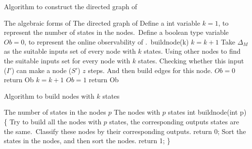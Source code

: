 \begin{algorithm}[h]
\caption{Algorithm to construct the directed graph of \BCNs}
\begin{algorithmic}[1]
\REQUIRE 
The algebraic forms of \BCN
\ENSURE  
The directed graph of \BCN
\STATE Define a int variable $k=1$, to represent the number of states in the nodes.\
\STATE Define a boolean type variable $Ob=0$, to represent the online observability of \BCN.\
\STATE buildnode(k)
\STATE $k= k+1$
\STATE Take $\Delta_M$ as the suitable inputs set of every node with $k$ states.
\ELSE
\IF{$k>2$}
\STATE Using other nodes to find the suitable inputs set for every node with $k$ states. 
\ENDIF
\ENDIF
{}
\STATE Checking whether this input ($I'$) can make a node ($S'$) $z$ steps. 
\STATE And then build edges for this node. 
\ENDFOR
\ENDFOR
{}
\STATE $Ob=0$ return Ob
\ENDIF
\STATE $k= k+1$
\ENDWHILE
\STATE $Ob=1$ return Ob
\end{algorithmic}
 \label{alg:1}
\end{algorithm}

\begin{algorithm}[h]
\caption{Algorithm to build nodes with $k$ states}
\begin{algorithmic}[1]
\REQUIRE 
The number of states in the nodes $p$
\ENSURE  
The nodes with $p$ states
\STATE int buildnode(int p)
\STATE  \{ 
\STATE  Try to build all the nodes with $p$ states, the corresponding outputs states are the same.\
\STATE  Classify these nodes by their corresponding outputs.
\STATE  return 0;
\ELSE 
\STATE Sort the states in the nodes, and then sort the nodes. %
\STATE return 1;
\ENDIF 
\STATE \}
\end{algorithmic}
 \label{alg:2}
\end{algorithm}

